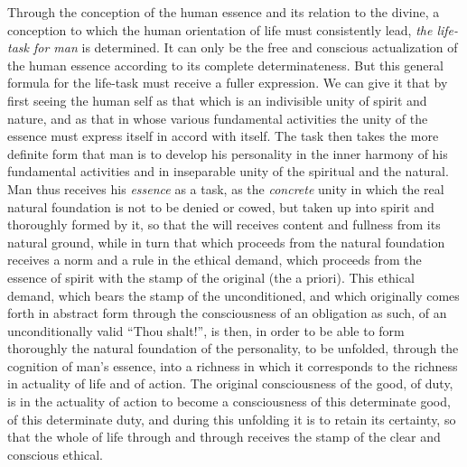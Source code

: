 \documentclass[12pt,a4paper,openany]{book}
\newcommand{\opage}[1]{\marginnote{\footnotesize\textit{[#1]}}}
\begin{document}
Through the conception of the human essence and its relation
to the divine, a conception to which the human orientation of life
must consistently lead, \emph{the life-task for man} is determined.
It can only be the free and conscious actualization
of the human essence according to its complete determinateness.
But this general formula for the life-task must receive a
fuller expression. We can give it that by first
seeing the human self as that which is an indivisible unity
of spirit and nature, and as that in whose various fundamental activities
the unity of the essence must express itself in accord
with itself. The task then takes the more definite form that
man is to develop his personality in the inner harmony of his
fundamental activities and in inseparable unity of the spiritual
and the natural. Man thus receives his \emph{essence} as a
\opage{503}task, as the \emph{concrete} unity in which the real
natural foundation is not to be denied or cowed, but taken up
into spirit and thoroughly formed by it, so that the will receives
content and fullness from its natural ground, while in turn that which
proceeds from the natural foundation receives a norm and a
rule in the ethical demand, which proceeds from the essence of spirit
with the stamp of the original (the a priori). This
ethical demand, which bears the stamp of the unconditioned, and which originally
comes forth in abstract form through the consciousness
of an obligation as such, of an unconditionally valid
``Thou shalt!'', is then, in order to be able to form thoroughly the natural
foundation of the personality, to be unfolded, through the cognition of man's
essence, into a richness in which it corresponds to the richness in actuality
of life and of action. The original consciousness
of the good, of duty, is in the actuality of action
to become a consciousness of this determinate good,
of this determinate duty, and during this unfolding it is to
retain its certainty, so that the whole of life through and through receives
the stamp of the clear and conscious ethical.
\end{document}
